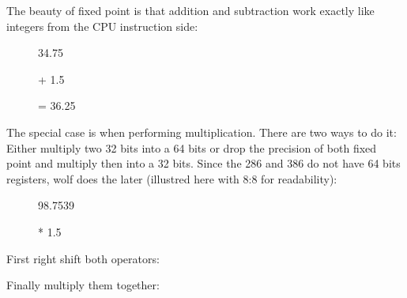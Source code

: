 \bigskip

The beauty of fixed point is that addition and subtraction work exactly like integers from the CPU instruction side:\\




\par
\begin{figure}[H]
 \centering
   

   \caption{34.75} 
\end{figure} 

\begin{figure}[H]
 \centering
   
  \caption{+ 1.5} 
\end{figure} 

\begin{figure}[H]
 \centering
   
  {\caption{= 36.25}}
\end{figure} 
\par
\par


 The special case is when performing multiplication. There are two ways to do it: Either multiply two 32 bits into a 64 bits or drop the precision of both fixed point and multiply then into a 32 bits. Since the 286 and 386 do not have 64 bits registers, wolf does the later (illustred here with 8:8 for readability):


\par
\begin{figure}[H]
 \centering
   
   \caption{98.7539} 
\end{figure} 
\par
\begin{figure}[H]
 \centering
   
   \caption{* 1.5} 
\end{figure} 
\par
First right shift both operators:\\
\par
\begin{figure}[H]
 \centering
   
\end{figure} 
\par
\begin{figure}[H]
 \centering
   
\end{figure} 
\par

Finally multiply them together:


